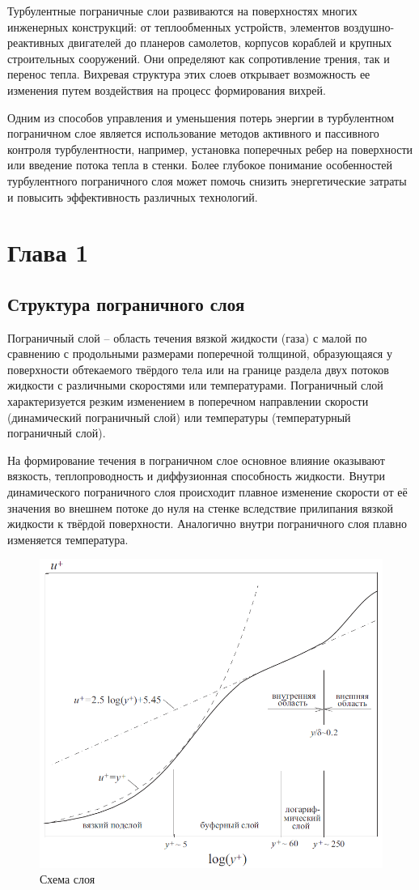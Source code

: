 \documentclass[a4paper]{article}
\newcommand{\numsection}[1]{\section*{#1}\addcontentsline{toc}{section}{#1} \refstepcounter{section}}
\begin{document}
		Турбулентные пограничные слои развиваются на поверхностях многих инженерных конструкций: от теплообменных устройств, элементов воздушно-реактивных двигателей до планеров самолетов, корпусов кораблей и крупных строительных сооружений. Они определяют как сопротивление трения, так и перенос тепла. Вихревая структура этих слоев открывает возможность ее изменения путем воздействия на процесс формирования вихрей. 
		
		Одним из способов управления и уменьшения потерь энергии в турбулентном пограничном слое является использование методов активного и пассивного контроля турбулентности, например, установка поперечных ребер на поверхности или введение потока тепла в стенки. Более глубокое понимание особенностей турбулентного пограничного слоя может помочь снизить энергетические затраты и повысить эффективность различных технологий.
		\newpage
	\numsection{Глава 1}
	\subsection{Структура пограничного слоя}
		Пограничный слой -- область течения вязкой жидкости (газа) с малой по сравнению с продольными размерами поперечной толщиной, образующаяся у поверхности обтекаемого твёрдого тела или на границе раздела двух потоков жидкости с различными скоростями или температурами. Пограничный слой характеризуется резким изменением в поперечном направлении скорости (динамический пограничный слой) или температуры (температурный пограничный слой).
		
		На формирование течения в пограничном слое основное влияние оказывают вязкость, теплопроводность и диффузионная способность жидкости. Внутри динамического пограничного слоя происходит плавное изменение скорости от её значения во внешнем потоке до нуля на стенке вследствие прилипания вязкой жидкости к твёрдой поверхности. Аналогично внутри пограничного слоя плавно изменяется температура.\\		
	\begin{figure}[h]
		\centering
		\includegraphics[width=0.7\linewidth]{../Assets/ПогранСлой}
		\caption{Схема слоя}
	\end{figure}
		
\end{document}
